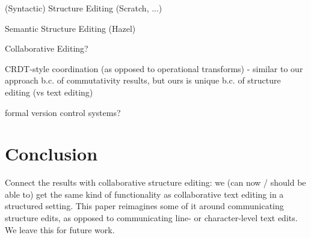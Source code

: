 \documentclass[nonacm, acmsmall, screen, review]{acmart}
\begin{document}
% 

(Syntactic) Structure Editing (Scratch, ...)


Semantic Structure Editing (Hazel)

Collaborative Editing?

CRDT-style coordination (as opposed to operational transforms)
- similar to our approach b.c. of commutativity results, but ours is unique b.c. of structure editing (vs text editing)

formal version control systems?


\section{Conclusion}
\label{sec:conclusion}

Connect the results with collaborative structure editing: we (can now / should be able to) get the same kind of functionality as collaborative text editing in a structured setting. 
This paper reimagines some of it around communicating structure edits, as opposed to communicating line- or character-level text edits.
We leave this for future work.


\end{document}
